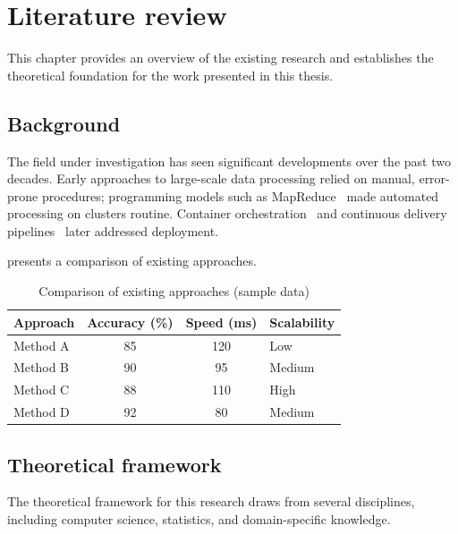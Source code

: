 \section{Literature review}\label{sec:literature}

This chapter provides an overview of the existing research and establishes the theoretical foundation for the work presented in this thesis.

\subsection{Background}

The field under investigation has seen significant developments over the past two decades.
Early approaches to large-scale data processing relied on manual, error-prone procedures; programming models such as MapReduce~\cite{dean2008mapreduce} made automated processing on clusters routine.
Container orchestration~\cite{burns2016borg} and continuous delivery pipelines~\cite{shahin2017continuous} later addressed deployment.

 presents a comparison of existing approaches.

\begin{table}[htbp]
  \centering
  \caption{Comparison of existing approaches (sample data)}\label{tab:comparison}
  \begin{tabular}{l S[table-format=2.0] S[table-format=3.0] l}
    \toprule
    Approach & {Accuracy (\%)} & {Speed (ms)} & Scalability \\
    \midrule
    Method A & 85 & 120 & Low    \\
    Method B & 90 & 95  & Medium \\
    Method C & 88 & 110 & High   \\
    Method D & 92 & 80  & Medium \\
    \bottomrule
  \end{tabular}
\end{table}

\subsection{Theoretical framework}

The theoretical framework for this research draws from several disciplines, including computer science, statistics, and domain-specific knowledge.

